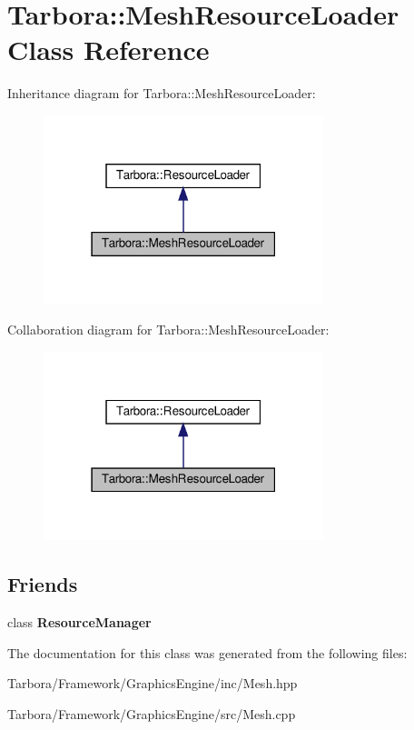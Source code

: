 \hypertarget{classTarbora_1_1MeshResourceLoader}{}\section{Tarbora\+:\+:Mesh\+Resource\+Loader Class Reference}
\label{classTarbora_1_1MeshResourceLoader}


Inheritance diagram for Tarbora\+:\+:Mesh\+Resource\+Loader\+:\nopagebreak
\begin{figure}[H]
\begin{center}
\leavevmode
\includegraphics[width=231pt]{classTarbora_1_1MeshResourceLoader__inherit__graph}
\end{center}
\end{figure}


Collaboration diagram for Tarbora\+:\+:Mesh\+Resource\+Loader\+:\nopagebreak
\begin{figure}[H]
\begin{center}
\leavevmode
\includegraphics[width=231pt]{classTarbora_1_1MeshResourceLoader__coll__graph}
\end{center}
\end{figure}
\subsection*{Friends}
\begin{DoxyCompactItemize}
\item 
\mbox{\label{classTarbora_1_1MeshResourceLoader_a54c1252abc87a78a301e6b6984470408}} 
class {\bfseries Resource\+Manager}
\end{DoxyCompactItemize}


The documentation for this class was generated from the following files\+:\begin{DoxyCompactItemize}
\item 
Tarbora/\+Framework/\+Graphics\+Engine/inc/Mesh.\+hpp\item 
Tarbora/\+Framework/\+Graphics\+Engine/src/Mesh.\+cpp\end{DoxyCompactItemize}
